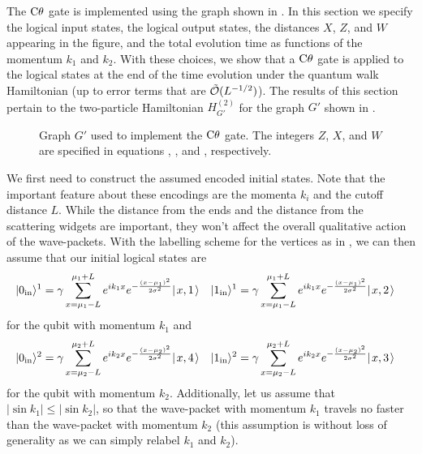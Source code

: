 \documentclass[../thesis-main/thesis-main]{subfiles}
\begin{document}
The $\CD$ gate is implemented using the graph shown in . In this section we specify the logical input states, the logical output states, the distances $X$, $Z$, and $W$ appearing in the figure, and the total evolution time as functions of the momentum $k_{1}$ and $k_{2}$. With these choices, we show that a $\CD$ gate is applied to the logical states at the end of the time evolution under the quantum walk Hamiltonian (up to error terms that are $\tilde{\mathcal{O}}(L^{-{1}/{2}})$). The results of this section pertain to the two-particle Hamiltonian $H^{(2)}_{G'}$ for the graph $G'$ shown in .

\begin{figure}
  \centering
   
  \caption[Explicit $\CD$ gate]{Graph $G'$ used to implement the $\CD$ gate. The integers $Z$, $X$, and $W$ are specified in equations , , and , respectively.}
\label{fig:explicit_cd}
\end{figure}

We first need to construct the assumed encoded initial states.  Note that the important feature about these encodings are the momenta $k_i$ and  the cutoff distance $L$.  While the distance from the ends and the distance from the scattering widgets are important, they won't affect the overall qualitative action of the wave-packets.  With the labelling scheme for the vertices as in , we can then assume that our initial logical states are
\begin{align}
  |0_{\text{in}}\rangle^{1}&=  \gamma \sum_{x = \mu_1 -L} ^{\mu_1 + L}  e^{i k_{1} x} e^{- \frac{(x-\mu_1)^2}{2\sigma^2}} |\mspace{2mu} x,1 \mspace{2mu} \rangle & 
  |1_\text{in}\rangle^1&= \gamma \sum_{x = \mu_1 -L} ^{\mu_1 + L}  e^{i k_{1} x} e^{- \frac{(x-\mu_1)^2}{2\sigma^2}} |\mspace{2mu} x,2 \mspace{2mu} \rangle \label{eq:cd_input_1}
\end{align}
for the qubit with momentum $k_1$ and
\begin{align}
  |0_{\text{in}}\rangle^2&=\gamma \sum_{x = \mu_2 -L} ^{\mu_2 + L}  e^{i k_{2} x} e^{- \frac{(x-\mu_2)^2}{2\sigma^2}} |\mspace{2mu} x,4 \mspace{2mu} \rangle&
  |1_\text{in}\rangle^2&=\gamma \sum_{x = \mu_2 -L} ^{\mu_2 + L}  e^{i k_{2} x} e^{- \frac{(x-\mu_2)^2}{2\sigma^2}} |\mspace{2mu} x,3 \mspace{2mu} \rangle \label{eq:cd_input_2}
\end{align}
 for the qubit with momentum $k_2$.  Additionally, let us assume that $|\sin k_1| \leq |\sin k_2|$, so that the wave-packet with momentum $k_1$ travels no faster than the wave-packet with momentum $k_2$ (this assumption is without loss of generality as we can simply relabel $k_1$ and $k_2$).
 
\end{document}
